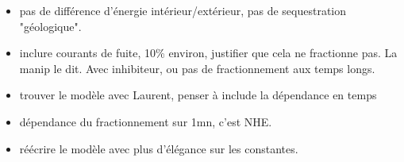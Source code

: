 \documentclass[aps,onecolumn]{revtex4}
\begin{document}
\begin{itemize}

\item pas de différence d'énergie intérieur/extérieur, pas de sequestration "géologique".

\item inclure courants de fuite, 10\% environ, justifier que cela ne fractionne pas. La manip le dit. Avec inhibiteur, ou pas de fractionnement aux temps longs.

\item trouver le modèle avec Laurent, penser à include la dépendance en temps 

\item dépendance du fractionnement sur 1mn, c'est NHE.
\item réécrire le modèle avec plus d'élégance sur les constantes.
\end{itemize}
\end{document}
